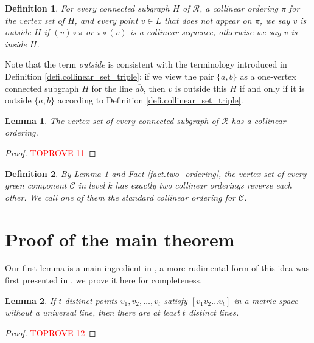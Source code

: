 \documentclass[12pt]{article}
\newcommand{\ov}{\overline}
\newtheorem{lem}{Lemma}
\newtheorem{defi}{Definition}
\begin{document}
\begin{defi}
For every connected subgraph $H$ of $\mathcal{R}$,
a collinear ordering $\pi$ for the vertex set of $H$,
and every point $v \in L$ that does not appear on $\pi$,
we say $v$ is {\em outside} $H$ if $(v) \circ \pi$ or $\pi \circ (v)$ is a collinear sequence,
otherwise we say $v$ is {\em inside} $H$.
\end{defi}

Note that the term {\em outside} is consistent with the terminology introduced in Definition \ref{defi.collinear_set_triple}: 
if we view the pair $\{a, b\}$ as a one-vertex connected subgraph $H$ for the line $\ov{ab}$, 
then $v$ is outside this $H$ if and only if it is outside $\{a, b\}$ according to Definition \ref{defi.collinear_set_triple}.

\begin{lem}\label{lemma.P_line}
The vertex set of every connected subgraph of $\mathcal{R}$ has a collinear ordering.
\end{lem}

\begin{proof}\textcolor{red}{TOPROVE 11}\end{proof}

\begin{defi}
By Lemma \ref{lemma.P_line} and Fact \ref{fact.two_ordering},
the vertex set of every green component $\mathcal{C}$ in level $k$
has exactly two collinear orderings reverse each other.
We call one of them the {\em standard collinear ordering} for $\mathcal{C}$.
\end{defi}

\section{Proof of the main theorem}\label{sect.proof_main}

Our first lemma is a main ingredient in \cite{ACHKS},
a more rudimental form of this idea was first presented in \cite{KP},
we prove it here for completeness.

\begin{lem}\label{lem.long_path}
If $t$ distinct points $v_1, v_2, \dots, v_t$ satisfy
$[v_1v_2\dots v_t]$ in a metric space without a universal line,
then there are at least $t$ distinct lines.
\end{lem}

\begin{proof}\textcolor{red}{TOPROVE 12}\end{proof}
\end{document}
